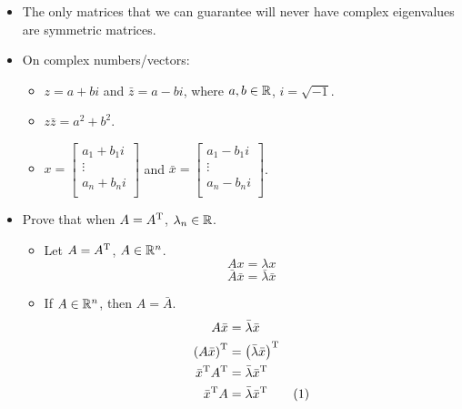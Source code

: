 \documentclass{article}
\begin{document}
\begin{itemize}
\begin{itemize}
    \end{itemize}
    \item The only matrices that we can guarantee will never have complex eigenvalues are symmetric matrices.
    \item On complex numbers/vectors:
    \begin{itemize}
        \item $z=a+bi$ and $\bar{z}=a-bi$, where $a,b\in\mathbb{R}$, $i=\sqrt{-1}$.
        \item $z\bar{z} = a^2+b^2$.
        \item $
            x =
            \begin{bmatrix}
                a_1+b_1i\\
                \vdots\\
                a_n+b_ni\\
            \end{bmatrix}
        $ and $
            \bar{x} =
            \begin{bmatrix}
                a_1-b_1i\\
                \vdots\\
                a_n-b_ni\\
            \end{bmatrix}
        $.
    \end{itemize}
    \item Prove that when $A = A^{\text{T}}$, $\lambda_n\in\mathbb{R}$.
    \begin{itemize}
        \item Let $A = A^{\text{T}}$, $A\in\mathbb{R}^n$.
        \begin{equation}\label{eqn:ortho3}
            Ax = \lambda x
        \end{equation}
        \begin{equation*}
            \bar{A}\bar{x} = \bar{\lambda}\bar{x}
        \end{equation*}
        \item If $A\in\mathbb{R}^n$, then $A=\bar{A}$.
        \begin{align*}
            A\bar{x} &= \bar{\lambda}\bar{x}\\
            \left( A\bar{x} \right)^\T &= \left( \bar{\lambda}\bar{x} \right)^\T\\
            \bar{x}^\T A^\T &= \bar{\lambda}\bar{x}^\T\\
            \bar{x}^\T A &= \bar{\lambda}\bar{x}^\T\stepcounter{equation}\tag{\theequation}\label{eqn:ortho4}\\
        \end{align*}

\end{itemize}
\end{itemize}
\end{document}
